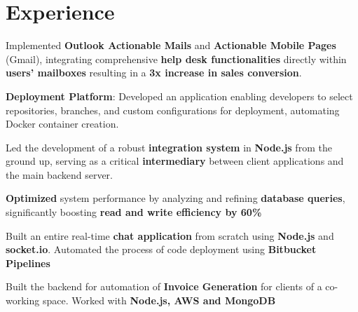 \documentclass{deedy-resume-openfont}
\begin{document}
\begin{minipage}[t]{0.33\textwidth}
\sectionsep


\end{minipage} 
\hfill
\begin{minipage}[t]{0.66\textwidth} 


\section{Experience}

\vspace{\topsep} %
\begin{tightemize}
\item Implemented \textbf{Outlook Actionable Mails} and \textbf{Actionable Mobile Pages} (Gmail), integrating comprehensive \textbf{help desk functionalities} directly within \textbf{users' mailboxes} resulting in a \textbf{3x increase in sales conversion}.
\item \textbf{Deployment Platform}: Developed an application enabling developers to select repositories, branches, and custom configurations for deployment, automating Docker container creation.
\item Led the development of a robust \textbf{integration system} in \textbf{Node.js} from the ground up, serving as a critical \textbf{intermediary} between client applications and the main backend server.
\item  \textbf{Optimized} system performance by analyzing and refining \textbf{database queries}, significantly boosting \textbf{read and write efficiency by 60\%}
\end{tightemize}
\sectionsep

\begin{tightemize}
\item Built an entire real-time \textbf{chat application} from scratch using \textbf{Node.js} and \textbf{socket.io}. Automated the process of code deployment using \textbf{Bitbucket Pipelines}
\item Built the backend for automation of \textbf{Invoice Generation} for clients of a co-working space. Worked with \textbf{Node.js, AWS and MongoDB}
\end{tightemize}
\sectionsep


\end{minipage}
\end{document}
